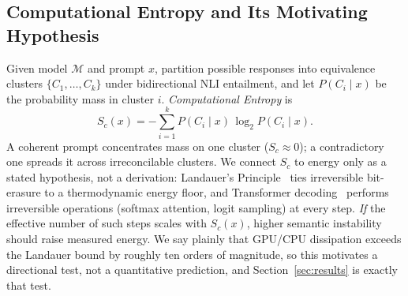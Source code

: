 \documentclass[conference]{IEEEtran}
\begin{document}
\subsection{Computational Entropy and Its Motivating Hypothesis}
Given model $\mathcal{M}$ and prompt $x$, partition possible responses
into equivalence clusters $\{C_1,\ldots,C_k\}$ under bidirectional NLI
entailment, and let $P(C_i\mid x)$ be the probability mass in cluster
$i$. \emph{Computational Entropy} is
\begin{equation}
  S_c(x) = -\sum_{i=1}^{k} P(C_i \mid x)\,\log_2 P(C_i \mid x).
  \label{eq:sc}
\end{equation}
A coherent prompt concentrates mass on one cluster ($S_c\approx0$); a
contradictory one spreads it across irreconcilable clusters. We
connect $S_c$ to energy only as a stated hypothesis, not a derivation:
Landauer's Principle~\cite{landauer1961irrev,berut2012experimental}
ties irreversible bit-erasure to a thermodynamic energy floor, and
Transformer decoding~\cite{vaswani2017attention} performs irreversible
operations (softmax attention, logit sampling) at every step. \emph{If}
the effective number of such steps scales with $S_c(x)$, higher
semantic instability should raise measured energy. We say plainly that
GPU/CPU dissipation exceeds the Landauer bound by roughly ten orders
of magnitude, so this motivates a directional test, not a quantitative
prediction, and Section~\ref{sec:results} is exactly that test.
\end{document}
